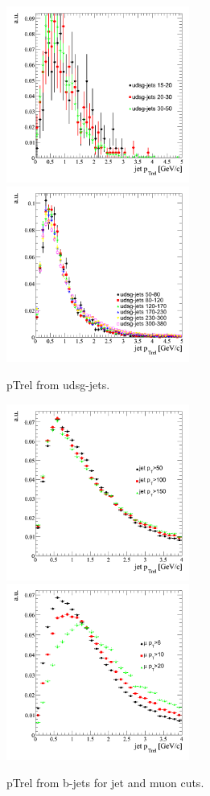 \begin{figure}[htbp]
  \begin{center}
    \includegraphics[width=60mm]{Figures/jet_ptreludsgqcdbinned.png}
    \includegraphics[width=60mm]{Figures/jet_ptreludsgqcdbinned2.png}
  \end{center}
  \caption{pTrel from udsg-jets.}
  \label{fig:jet_ptrel}
\end{figure}

\begin{figure}[htbp]
  \begin{center}
    \includegraphics[width=60mm]{Figures/jet_ptrelb_jetcuts.png}
    \includegraphics[width=60mm]{Figures/jet_ptrelb_mucuts.png}
  \end{center}
  \caption{pTrel from b-jets for jet and muon cuts.}
  \label{fig:jet_ptrel}
\end{figure}

